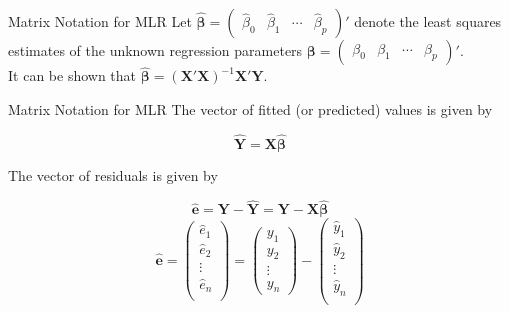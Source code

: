 \documentclass[11pt]{beamer}
\begin{document}
\begin{frame}{Matrix Notation for MLR}
Let $\bm{\hat{\beta}} = \begin{pmatrix} \hat{\beta}_0 & \hat{\beta}_1 & \cdots & \hat{\beta}_p \end{pmatrix}'$ denote the least squares estimates of the unknown regression parameters $\bm{\beta} = \begin{pmatrix} \beta_0 & \beta_1 & \cdots & \beta_p \end{pmatrix}'$.\\
\vspace{15pt}
It can be shown that $\bm{\hat{\beta}} = (\bm{X'X})^{-1} \bm{X}' \bm{Y}$.\\
\end{frame}

\begin{frame}{Matrix Notation for MLR}
The vector of fitted (or predicted) values is given by

$$\bm{\hat{Y}} = \bm{X} \bm{\hat{\beta}}$$
\vspace{5pt}

The vector of residuals is given by

$$\bm{\hat{e}} = \bm{Y} - \bm{\hat{Y}} = \bm{Y} - \bm{X}\bm{\hat{\beta}}$$
\vspace{5pt}
$$\bm{\hat{e}} = 
\begin{pmatrix}
\hat{e}_1\\
\hat{e}_2\\
\vdots\\
\hat{e}_n\\
\end{pmatrix}
=
\begin{pmatrix}
y_1\\
y_2\\
\vdots\\
y_n
\end{pmatrix}
-
\begin{pmatrix}
\hat{y}_1\\
\hat{y}_2\\
\vdots\\
\hat{y}_n\\
\end{pmatrix}$$
\end{frame}
\end{document}
